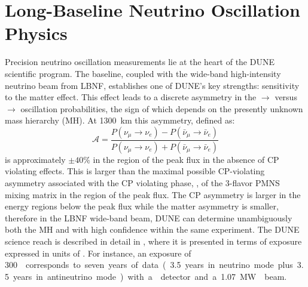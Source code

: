 

\section{Long-Baseline Neutrino Oscillation Physics}

Precision neutrino oscillation measurements lie at the heart of the DUNE scientific program.
The  baseline, coupled with the wide-band
high-intensity neutrino beam from LBNF, establishes one of DUNE's key
strengths: sensitivity to the matter effect. This effect leads to a
discrete asymmetry in the \numu $\to$ \nue versus \anumu $\to$ \anue
oscillation probabilities, the sign of which depends on the presently
unknown mass hierarchy (MH).  At 1300~km this asymmetry, defined as:
\begin{equation}
\mathcal{A} = \frac{ P(\nu_\mu \rightarrow \nu_e)-P(\bar{\nu}_\mu \rightarrow \bar{\nu}_e)}{P(\nu_\mu \rightarrow \nu_e)+P(\bar{\nu}_\mu \rightarrow \bar{\nu}_e)}
\end{equation}
is approximately $\pm 40\%$ in the region of the peak flux in the
absence of CP violating effects. This is larger than the maximal
possible CP-violating asymmetry associated with the CP violating
phase, \deltacp, of the 3-flavor PMNS mixing matrix in the region of
the peak flux. The CP asymmetry is larger in the energy regions below the peak
flux while the matter asymmetry is smaller, therefore in the LBNF
wide-band beam, DUNE can determine unambiguously both the MH and
\deltacp with high confidence within the same experiment.
The DUNE science reach is described in detail in \volphys, where it is presented 
in terms of  exposure expressed in units of \ktMWyr{}. For instance, an
exposure of \SI{300}\ktMWyr{} corresponds to seven years of data
(\num{3.5} years in neutrino mode plus \num{3.5} years in antineutrino
mode) with a  detector and a \SI{1.07}\MW{} beam.

